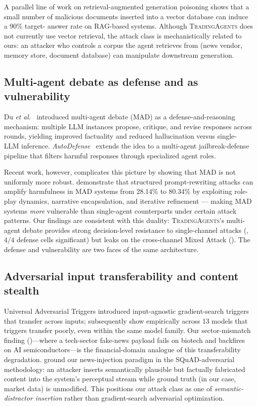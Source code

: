 \documentclass[10pt,letterpaper]{article}
\newcommand{\TA}{\textsc{TradingAgents}}
\begin{document}
A parallel line of work on retrieval-augmented generation poisoning
\citep{zou2025poisonedrag} shows that a small number of malicious
documents inserted into a vector database can induce a 90\% target-
answer rate on RAG-based systems. Although \TA{} does not currently
use vector retrieval, the attack class is mechanistically related to
ours: an attacker who controls a corpus the agent retrieves from
(news vendor, memory store, document database) can manipulate
downstream generation.

\subsection{Multi-agent debate as defense and as vulnerability}
\label{sec:related-mad}

Du \emph{et al.}~\citep{du2024multiagentdebate} introduced multi-agent
debate (MAD) as a defense-and-reasoning mechanism: multiple LLM
instances propose, critique, and revise responses across rounds,
yielding improved factuality and reduced hallucination versus single-
LLM inference. \emph{AutoDefense}~\citep{zeng2024autodefense} extends
the idea to a multi-agent jailbreak-defense pipeline that filters
harmful responses through specialized agent roles.

Recent work, however, complicates this picture by showing that MAD is
not uniformly more robust. \citet{zhang2025madvulnerable}
demonstrate that structured prompt-rewriting attacks can amplify
harmfulness in MAD systems from 28.14\% to 80.34\% by exploiting role-
play dynamics, narrative encapsulation, and iterative refinement
--- making MAD systems \emph{more} vulnerable than single-agent
counterparts under certain attack patterns. Our findings are
consistent with this duality: \TA's multi-agent debate provides
strong decision-level resistance to single-channel attacks
(, $4/4$ defense cells significant) but
leaks on the cross-channel Mixed Attack ().
The defense and vulnerability are two faces of the same architecture.

\subsection{Adversarial input transferability and content stealth}
\label{sec:related-transfer}

Universal Adversarial Triggers \citep{wallace2019triggers} introduced
input-agnostic gradient-search triggers that transfer across inputs;
\citet{meade2024universalnotuniversal} subsequently show empirically
across 13 models that triggers transfer poorly, even within the same
model family. Our sector-mismatch finding
()---where a tech-sector fake-news payload
fails on biotech and backfires on AI semiconductors---is the
financial-domain analogue of this transferability degradation.
\citet{jia2017adversarial} ground our news-injection paradigm in the
SQuAD-adversarial methodology: an attacker inserts semantically
plausible but factually fabricated content into the system's
perceptual stream while ground truth (in our case, market data) is
unmodified. This positions our attack class as one of \emph{semantic-
distractor insertion} rather than gradient-search adversarial
optimization.
\end{document}
